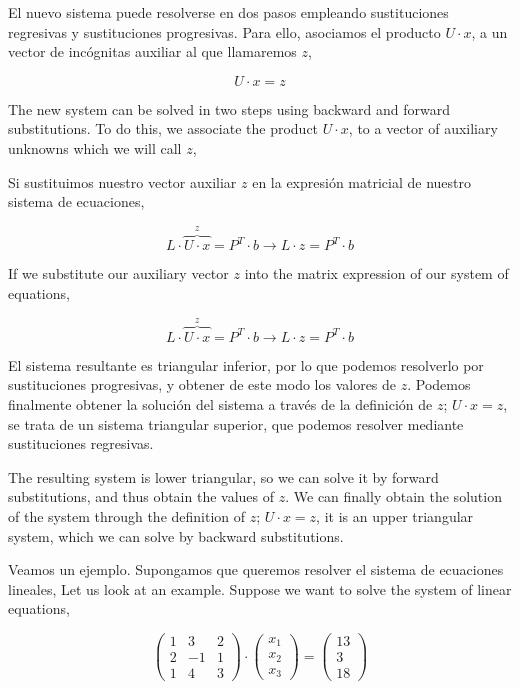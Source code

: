 \begin{paracol}{2}
\switchcolumn
El nuevo sistema puede resolverse en dos pasos empleando sustituciones regresivas y sustituciones progresivas. Para ello, asociamos el producto $U\cdot x$, a un vector de incógnitas auxiliar al que llamaremos $z$,

\begin{equation*}
U\cdot x=z
\end{equation*}

\switchcolumn
The new system can be solved in two steps using backward and forward substitutions. To do this, we associate the product $U \cdot x$, to a vector of auxiliary unknowns which we will call $z$,

\switchcolumn
Si sustituimos nuestro vector auxiliar $z$ en la expresión matricial de nuestro sistema de ecuaciones,

\begin{equation*}
L\cdot \overbrace{U\cdot x}^z=P^T\cdot b \rightarrow L\cdot z=P^T\cdot b
\end{equation*}

\switchcolumn
If we substitute our auxiliary vector $z$ into the matrix expression of our system of equations,

\begin{equation*}
L\cdot \overbrace{U\cdot x}^z=P^T\cdot b \rightarrow L\cdot z=P^T\cdot b
\end{equation*}

\switchcolumn
El sistema resultante es triangular inferior, por lo que podemos resolverlo por sustituciones progresivas, y obtener de este modo los valores de $z$. Podemos finalmente obtener la solución del sistema a través de la definición de $z$; $U\cdot x =z$, se trata de un sistema triangular superior, que podemos resolver mediante sustituciones regresivas.

\switchcolumn
The resulting system is lower triangular, so we can solve it by forward substitutions, and thus obtain the values of $z$. We can finally obtain the solution of the system through the definition of $z$; $U \cdot x =z$, it is an upper triangular system, which we can solve by backward substitutions.

\switchcolumn
Veamos un ejemplo. Supongamos que queremos resolver el sistema de ecuaciones lineales,
\switchcolumn
Let us look at an example. Suppose we want to solve the system of linear equations,
\end{paracol}


\begin{equation*}
\begin{pmatrix}
1& 3& 2\\
2& -1& 1\\
1& 4& 3
\end{pmatrix}\cdot \begin{pmatrix}
x_1\\
x_2\\
x_3
\end{pmatrix}=\begin{pmatrix}
13\\
3\\
18
\end{pmatrix}
\end{equation*}

